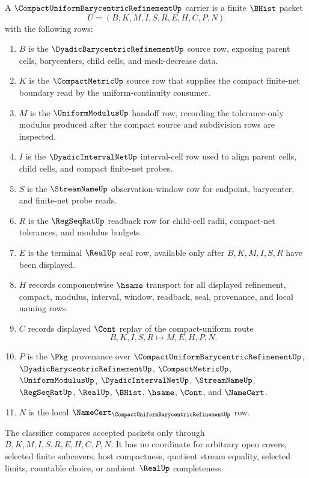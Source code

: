 \begin{definition}\label{def:compact-uniform-barycentric-refinement-carrier}
A $\CompactUniformBarycentricRefinementUp$ carrier is a finite $\BHist$ packet
$$
U=(B,K,M,I,S,R,E,H,C,P,N)
$$
with the following rows:
\begin{enumerate}
\item $B$ is the $\DyadicBarycentricRefinementUp$ source row, exposing parent cells, barycenters, child cells, and mesh-decrease data.
\item $K$ is the $\CompactMetricUp$ source row that supplies the compact finite-net boundary read by the uniform-continuity consumer.
\item $M$ is the $\UniformModulusUp$ handoff row, recording the tolerance-only modulus produced after the compact source and subdivision rows are inspected.
\item $I$ is the $\DyadicIntervalNetUp$ interval-cell row used to align parent cells, child cells, and compact finite-net probes.
\item $S$ is the $\StreamNameUp$ observation-window row for endpoint, barycenter, and finite-net probe reads.
\item $R$ is the $\RegSeqRatUp$ readback row for child-cell radii, compact-net tolerances, and modulus budgets.
\item $E$ is the terminal $\RealUp$ seal row, available only after $B,K,M,I,S,R$ have been displayed.
\item $H$ records componentwise $\hsame$ transport for all displayed refinement, compact, modulus, interval, window, readback, seal, provenance, and local naming rows.
\item $C$ records displayed $\Cont$ replay of the compact-uniform route
$$
B,K,I,S,R \longmapsto M,E,H,P,N .
$$
\item $P$ is the $\Pkg$ provenance over $\CompactUniformBarycentricRefinementUp$, $\DyadicBarycentricRefinementUp$, $\CompactMetricUp$, $\UniformModulusUp$, $\DyadicIntervalNetUp$, $\StreamNameUp$, $\RegSeqRatUp$, $\RealUp$, $\BHist$, $\hsame$, $\Cont$, and $\NameCert$.
\item $N$ is the local $\NameCert_{\CompactUniformBarycentricRefinementUp}$ row.
\end{enumerate}
The classifier compares accepted packets only through $B,K,M,I,S,R,E,H,C,P,N$. It has no coordinate for arbitrary open covers, selected finite subcovers, host compactness, quotient stream equality, selected limits, countable choice, or ambient $\RealUp$ completeness.
\end{definition}

